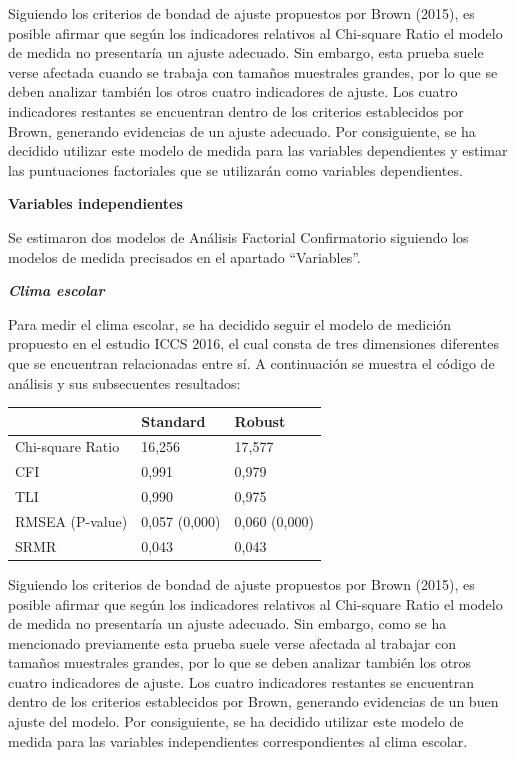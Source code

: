 \documentclass[12pt,twoside]{templates/facsothesis}
\begin{document}
Siguiendo los criterios de bondad de ajuste propuestos por Brown (2015), es posible afirmar que según los indicadores relativos al Chi-square Ratio el modelo de medida no presentaría un ajuste adecuado. Sin embargo, esta prueba suele verse afectada cuando se trabaja con tamaños muestrales grandes, por lo que se deben analizar también los otros cuatro indicadores de ajuste. Los cuatro indicadores restantes se encuentran dentro de los criterios establecidos por Brown, generando evidencias de un ajuste adecuado. Por consiguiente, se ha decidido utilizar este modelo de medida para las variables dependientes y estimar las puntuaciones factoriales que se utilizarán como variables dependientes.

\textbf{Variables independientes}

Se estimaron dos modelos de Análisis Factorial Confirmatorio siguiendo los modelos de medida precisados en el apartado ``Variables''.

\textbf{\emph{Clima escolar}}

Para medir el clima escolar, se ha decidido seguir el modelo de medición propuesto en el estudio ICCS 2016, el cual consta de tres dimensiones diferentes que se encuentran relacionadas entre sí. A continuación se muestra el código de análisis y sus subsecuentes resultados:

\begin{longtable}[]{@{}lll@{}}
\toprule
& Standard & Robust \\
\midrule
\endhead
Chi-square Ratio & 16,256 & 17,577 \\
CFI & 0,991 & 0,979 \\
TLI & 0,990 & 0,975 \\
RMSEA (P-value) & 0,057 (0,000) & 0,060 (0,000) \\
SRMR & 0,043 & 0,043 \\
\bottomrule
\end{longtable}

Siguiendo los criterios de bondad de ajuste propuestos por Brown (2015), es posible afirmar que según los indicadores relativos al Chi-square Ratio el modelo de medida no presentaría un ajuste adecuado. Sin embargo, como se ha mencionado previamente esta prueba suele verse afectada al trabajar con tamaños muestrales grandes, por lo que se deben analizar también los otros cuatro indicadores de ajuste. Los cuatro indicadores restantes se encuentran dentro de los criterios establecidos por Brown, generando evidencias de un buen ajuste del modelo. Por consiguiente, se ha decidido utilizar este modelo de medida para las variables independientes correspondientes al clima escolar.
\end{document}
